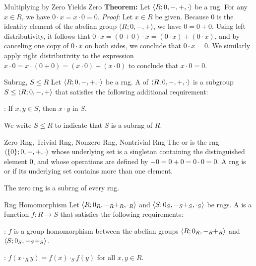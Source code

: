 \begin{thmbox}{Multiplying by Zero Yields Zero}
	\textbf{Theorem:} Let ${\langle {R; 0, -, +, \cdot} \rangle}$ be a rng. For any $x \in R$, we have $0 \cdot x = x \cdot 0 = 0$.
	\tcblower
	\textit{Proof:} Let $x \in R$ be given. Because $0$ is the identity element of the abelian group $\langle R; 0, -, + \rangle$, we have $0 = 0 + 0$. Using left distributivity, it follows that $0 \cdot x = (0 + 0) \cdot x = (0 \cdot x) + (0 \cdot x)$, and by canceling one copy of $0 \cdot x$ on both sides, we conclude that $0 \cdot x = 0$. We similarly apply right distributivity to the expression $x \cdot 0 = x \cdot (0 + 0) = (x \cdot 0) + (x \cdot 0)$ to conclude that $x \cdot 0 = 0$.
\end{thmbox}

\begin{dfnbox}{Subrng, $S \le R$}
	Let ${\langle {R; 0, -, +, \cdot} \rangle}$ be a rng. A  of ${\langle {R; 0, -, +, \cdot} \rangle}$ is a subgroup $S \le {\langle {R; 0, -, +} \rangle}$ that satisfies the following additional requirement:
	\begin{dfnitems}
		\item {}: If $x, y \in S$, then $x \cdot y$ in $S$.
	\end{dfnitems}
	We write $S \le R$ to indicate that $S$ is a subrng of $R$.
\end{dfnbox}

\begin{dfnbox}{Zero Rng, Trivial Rng, Nonzero Rng, Nontrivial Rng}
	The  or  is the rng ${\langle { \{0\}; 0, -, +, \cdot } \rangle}$ whose underlying set is a singleton containing the distinguished element $0$, and whose operations are defined by $-0 = 0 + 0 = 0 \cdot 0 = 0$. A rng is  or  if its underlying set contains more than one element.
\end{dfnbox}

The zero rng is a subrng of every rng.

\begin{dfnbox}{Rng Homomorphism}
	Let ${\langle {R; 0_R, -_R +_R, \cdot_R} \rangle}$ and ${\langle {S; 0_S, -_S +_S, \cdot_S} \rangle}$ be rngs. A  is a function $f: R \to S$ that satisfies the following requirements:
	\begin{dfnitems}
		\item {}: $f$ is a group homomorphism between the abelian groups ${\langle {R; 0_R, -_R +_R} \rangle}$ and ${\langle {S; 0_S, -_S +_S} \rangle}$.
		\item {}: $f(x \cdot_R y) = f(x) \cdot_S f(y)$ for all $x, y \in R$.
	\end{dfnitems}
\end{dfnbox}

